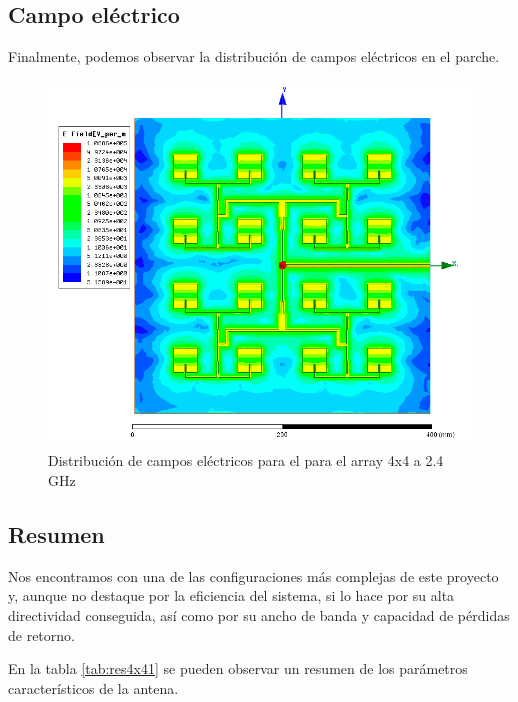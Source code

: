 \subsection{Campo eléctrico}
\par Finalmente, podemos observar la distribución de campos eléctricos en el parche. 

\begin{figure}[H]
    \centering
        \includegraphics[width=\textwidth]{archivos/analisis/4x41/8}
        \caption{Distribución de campos eléctricos para el para el array 4x4 a 2.4 GHz}
        \label{fig:elec4x41}
\end{figure}

\subsection{Resumen}
\par Nos encontramos con una de las configuraciones más complejas de este proyecto y, aunque no destaque por la eficiencia del sistema, si lo hace por su alta directividad conseguida, así como por su ancho de banda y capacidad de pérdidas de retorno.
\\
\par En la tabla \ref{tab:res4x41} se pueden observar un resumen de los parámetros característicos de la antena.

